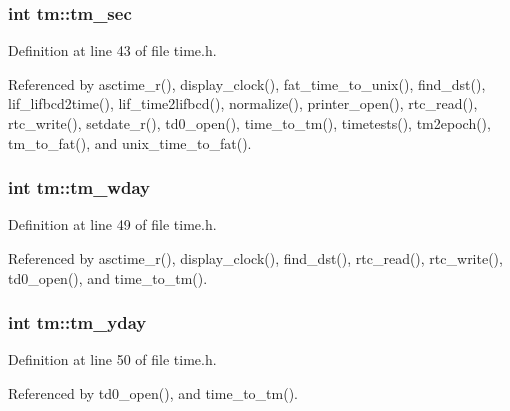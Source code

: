 \subsubsection[{\texorpdfstring{tm\+\_\+sec}{tm_sec}}]{\setlength{\rightskip}{0pt plus 5cm}int tm\+::tm\+\_\+sec}\hypertarget{structtm_a4d098a9a5c03a00b2ee61e10851de81e}{}\label{structtm_a4d098a9a5c03a00b2ee61e10851de81e}


Definition at line 43 of file time.\+h.



Referenced by asctime\+\_\+r(), display\+\_\+clock(), fat\+\_\+time\+\_\+to\+\_\+unix(), find\+\_\+dst(), lif\+\_\+lifbcd2time(), lif\+\_\+time2lifbcd(), normalize(), printer\+\_\+open(), rtc\+\_\+read(), rtc\+\_\+write(), setdate\+\_\+r(), td0\+\_\+open(), time\+\_\+to\+\_\+tm(), timetests(), tm2epoch(), tm\+\_\+to\+\_\+fat(), and unix\+\_\+time\+\_\+to\+\_\+fat().

\subsubsection[{\texorpdfstring{tm\+\_\+wday}{tm_wday}}]{\setlength{\rightskip}{0pt plus 5cm}int tm\+::tm\+\_\+wday}\hypertarget{structtm_afe81a8c46f1c693c43f259b288859f4f}{}\label{structtm_afe81a8c46f1c693c43f259b288859f4f}


Definition at line 49 of file time.\+h.



Referenced by asctime\+\_\+r(), display\+\_\+clock(), find\+\_\+dst(), rtc\+\_\+read(), rtc\+\_\+write(), td0\+\_\+open(), and time\+\_\+to\+\_\+tm().

\subsubsection[{\texorpdfstring{tm\+\_\+yday}{tm_yday}}]{\setlength{\rightskip}{0pt plus 5cm}int tm\+::tm\+\_\+yday}\hypertarget{structtm_a93a0ba77cc23796df84405dcbcc57eb1}{}\label{structtm_a93a0ba77cc23796df84405dcbcc57eb1}


Definition at line 50 of file time.\+h.



Referenced by td0\+\_\+open(), and time\+\_\+to\+\_\+tm().

